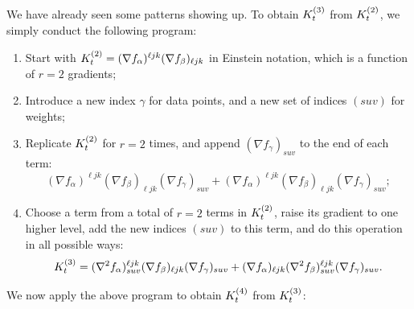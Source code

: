 We have already seen some patterns showing up. To obtain ${K}^{(3)}_t$ from ${K}^{(2)}_t$, we simply conduct the following program:
\begin{enumerate}[itemsep=0mm]
	\item Start with ${K}^{(2)}_t = (\nabla f_\alpha)^{\ell j k } (\nabla f_\beta)_{\ell j k}$ in Einstein notation, which is a function of $r = 2$ gradients;
	\item Introduce a new index $\gamma$ for data points, and a new set of indices $(s u v)$ for weights;
	\item Replicate ${K}^{(2)}_t$ for $r=2$ times, and append $(\nabla f_\gamma)_{suv}$ to the end of each term: 
	\[
		(\nabla f_\alpha)^{\ell j k } (\nabla f_\beta)_{\ell j k} (\nabla f_\gamma)_{suv}  + (\nabla f_\alpha)^{\ell j k } (\nabla f_\beta)_{\ell j k} (\nabla f_\gamma)_{suv} ;
	\]
	\item Choose a term from a total of $r=2$ terms in ${K}^{(2)}_t$, raise its gradient to one higher level, add the new indices $(suv)$ to this term, and do this operation in all possible ways:
	\[
		{K}^{(3)}_t = (\nabla^2 f_\alpha)^{\ell j k }_{suv} (\nabla f_\beta)_{\ell j k} (\nabla f_\gamma)_{suv}  + (\nabla f_\alpha)_{\ell j k } (\nabla^2 f_\beta)^{\ell j k}_{s u v} (\nabla f_\gamma)_{suv}.
	\]
\end{enumerate}
We now apply the above program to obtain ${K}^{(4)}_t$ from ${K}^{(3)}_t$:
